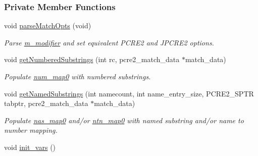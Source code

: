 \subsubsection*{Private Member Functions}
\begin{DoxyCompactItemize}
\item 
void \hyperlink{classjpcre2_1_1RegexMatch_a5cacfea4b4d3c26307fb10e88e711af3}{parse\+Match\+Opts} (void)
\begin{DoxyCompactList}\small\item\em Parse \hyperlink{classjpcre2_1_1RegexMatch_a5d3e216a4cfc80d00fc45c51a8136821}{m\+\_\+modifier} and set equivalent P\+C\+R\+E2 and J\+P\+C\+R\+E2 options. \end{DoxyCompactList}\item 
void \hyperlink{classjpcre2_1_1RegexMatch_a961a5f91ab24a1ddfd42910c6ab68b65}{get\+Numbered\+Substrings} (int rc, pcre2\+\_\+match\+\_\+data $\ast$match\+\_\+data)\hypertarget{classjpcre2_1_1RegexMatch_a961a5f91ab24a1ddfd42910c6ab68b65}{}\label{classjpcre2_1_1RegexMatch_a961a5f91ab24a1ddfd42910c6ab68b65}

\begin{DoxyCompactList}\small\item\em Populate \hyperlink{classjpcre2_1_1RegexMatch_a94ad930ea8cb22873737fda344bae508}{num\+\_\+map0} with numbered substrings. \end{DoxyCompactList}\item 
void \hyperlink{classjpcre2_1_1RegexMatch_af159e8d080ecd74f63ec67b1d5a27772}{get\+Named\+Substrings} (int namecount, int name\+\_\+entry\+\_\+size, P\+C\+R\+E2\+\_\+\+S\+P\+TR tabptr, pcre2\+\_\+match\+\_\+data $\ast$match\+\_\+data)\hypertarget{classjpcre2_1_1RegexMatch_af159e8d080ecd74f63ec67b1d5a27772}{}\label{classjpcre2_1_1RegexMatch_af159e8d080ecd74f63ec67b1d5a27772}

\begin{DoxyCompactList}\small\item\em Populate \hyperlink{classjpcre2_1_1RegexMatch_a36749947847f266de03c3991ac88a694}{nas\+\_\+map0} and/or \hyperlink{classjpcre2_1_1RegexMatch_a1c790683d023313967ce80db6045419f}{ntn\+\_\+map0} with named substring and/or name to number mapping. \end{DoxyCompactList}\item 
void \hyperlink{classjpcre2_1_1RegexMatch_a3da6a2319cd577d7f2f10c66dcf59a99}{init\+\_\+vars} ()\hypertarget{classjpcre2_1_1RegexMatch_a3da6a2319cd577d7f2f10c66dcf59a99}{}\label{classjpcre2_1_1RegexMatch_a3da6a2319cd577d7f2f10c66dcf59a99}


\end{DoxyCompactItemize}
